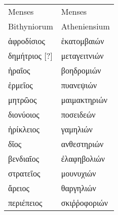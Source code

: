 %
\begin{tabular}{ l  l }
Menses                    & Menses\\
Bithyniorum               & Atheniensium \\
\hline
\textgreek{ἀφροδίσιος}    &\textgreek{ἑκατομβαιών} \\
\textgreek{δημήτριος [?]} &\textgreek{μεταγειτνιών} \\
\textgreek{ἡραῖος}        &\textgreek{βοηδρομιών} \\
%
\textgreek{ἑρμεῖος}        &\textgreek{πυανεψιών} \\
\textgreek{μητρῶος}       &\textgreek{μαιμακτηριών} \\
\textgreek{διονύοιος}      &\textgreek{ποσειδεών} \\
%
\textgreek{ἡρίκλειος}       &\textgreek{γαμηλιών} \\
\textgreek{δῖος}           &\textgreek{ανθεστηριών} \\
\textgreek{βενδιαῖος}        &\textgreek{ἐλαφηβολιών} \\
%
\textgreek{στρατεῖος}      &\textgreek{μουνυχιών} \\
\textgreek{ἄρειος}          &\textgreek{θαργηλιών} \\
\textgreek{περιέπειος}      &\textgreek{σκιῤῥοφοριών} \\
\end{tabular}
%

